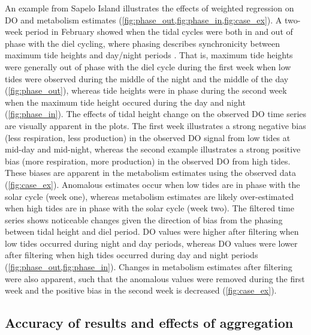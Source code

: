 \documentclass[letterpaper,12pt,oneside]{article}\usepackage[]{graphicx}\usepackage[]{color}
\begin{document}
An example from Sapelo Island illustrates the effects of weighted regression on \ac{DO} and metabolism estimates (\cref{fig:phase_out,fig:phase_in,fig:case_ex}).   A two-week period in February showed when the tidal cycles were both in and out of phase with the diel cycling, where phasing describes synchronicity between maximum tide heights and day/night periods \citep{Nidzieko14}.  That is, maximum tide heights were generally out of phase with the diel cycle during the first week when low tides were observed during the middle of the night and the middle of the day (\cref{fig:phase_out}), whereas tide heights were in phase during the second week when the maximum tide height occured during the day and night (\cref{fig:phase_in}).  The effects of tidal height change on the observed \ac{DO} time series are visually apparent in the plots. The first week illustrates a strong negative bias (less respiration, less production) in the observed \ac{DO} signal from low tides at mid-day and mid-night, whereas the second example illustrates a strong positive bias (more respiration, more production) in the observed \ac{DO} from high tides. These biases are apparent in the metabolism estimates using the observed data (\cref{fig:case_ex}).  Anomalous estimates occur when low tides are in phase with the solar cycle (week one), whereas metabolism estimates are likely over-estimated when high tides are in phase with the solar cycle (week two).  The filtered time series shows noticeable changes given the direction of bias from the phasing between tidal height and diel period.  \ac{DO} values were higher after filtering when low tides occurred during night and day periods, whereas \ac{DO} values were lower after filtering when high tides occurred during day and night periods (\cref{fig:phase_out,fig:phase_in}).  Changes in metabolism estimates after filtering were also apparent, such that the anomalous values were removed during the first week and the positive bias in the second week is decreased (\cref{fig:case_ex}).

\subsection{Accuracy of results and effects of aggregation}
\end{document}
